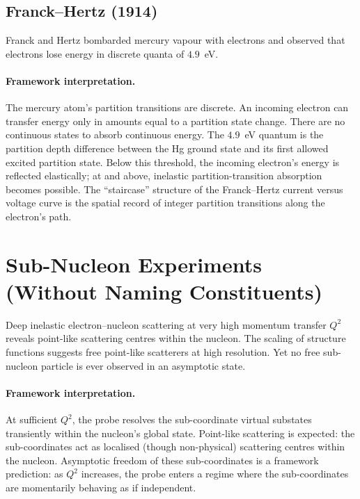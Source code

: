 \documentclass[11pt,a4paper]{article}
\theoremstyle{definition}
\theoremstyle{remark}
\begin{document}
\subsection{Franck--Hertz (1914)}

Franck and Hertz \citep{franckhertz1914} bombarded mercury vapour with electrons and observed that electrons lose energy in discrete quanta of $4.9$~eV.

\paragraph{Framework interpretation.} The mercury atom's partition transitions are discrete. An incoming electron can transfer energy only in amounts equal to a partition state change. There are no continuous states to absorb continuous energy. The $4.9$~eV quantum is the partition depth difference between the Hg ground state and its first allowed excited partition state. Below this threshold, the incoming electron's energy is reflected elastically; at and above, inelastic partition-transition absorption becomes possible. The ``staircase'' structure of the Franck--Hertz current versus voltage curve is the spatial record of integer partition transitions along the electron's path.

\section{Sub-Nucleon Experiments (Without Naming Constituents)}
\label{sec:dis}

Deep inelastic electron--nucleon scattering \citep{friedman1972} at very high momentum transfer $Q^2$ reveals point-like scattering centres within the nucleon. The scaling of structure functions suggests free point-like scatterers at high resolution. Yet no free sub-nucleon particle is ever observed in an asymptotic state.

\paragraph{Framework interpretation.} At sufficient $Q^2$, the probe resolves the sub-coordinate virtual substates transiently within the nucleon's global state. Point-like scattering is expected: the sub-coordinates act as localised (though non-physical) scattering centres within the nucleon. Asymptotic freedom of these sub-coordinates is a framework prediction: as $Q^2$ increases, the probe enters a regime where the sub-coordinates are momentarily behaving as if independent.
\end{document}
